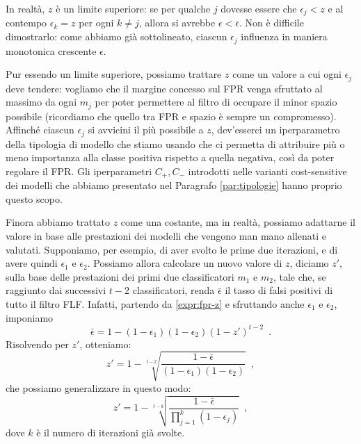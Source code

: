 In realtà, $z$ è un limite superiore: se per qualche $j$ dovesse essere che $\epsilon_j < z$ e al contempo $\epsilon_k=z$ per ogni $k\neq j$, allora si avrebbe $\epsilon < \bar \epsilon$. Non è difficile dimostrarlo: come abbiamo già sottolineato, ciascun $\epsilon_j$ influenza in maniera monotonica crescente $\epsilon$.

Pur essendo un limite superiore, possiamo trattare $z$ come un valore a cui ogni $\epsilon_j$ deve tendere: vogliamo che il margine concesso sul FPR venga sfruttato al massimo da ogni $m_j$ per poter permettere al filtro di occupare il minor spazio possibile (ricordiamo che quello tra FPR e spazio è sempre un compromesso). Affinché ciascun $\epsilon_j$ si avvicini il più possibile a $z$, dev'esserci un iperparametro della tipologia di modello che stiamo usando che ci permetta di attribuire più o meno importanza alla classe positiva rispetto a quella negativa, così da poter regolare il FPR. Gli iperparametri $C_+, C_-$ introdotti nelle varianti cost-sensitive dei modelli che abbiamo presentato nel Paragrafo \ref{par:tipologie} hanno proprio questo scopo.

Finora abbiamo trattato $z$ come una costante, ma in realtà, possiamo adattarne il valore in base alle prestazioni dei modelli che vengono man mano allenati e valutati. 
Supponiamo, per esempio, di aver svolto le prime due iterazioni, e di avere quindi $\epsilon_1$ e $\epsilon_2$. 
Possiamo allora calcolare un nuovo valore di $z$, diciamo $z'$, sulla base delle prestazioni dei primi due classificatori $m_1$ e $m_2$, tale che, se raggiunto dai successivi $t-2$ classificatori, renda $\bar\epsilon$ il tasso di falsi positivi di tutto il filtro FLF. Infatti, partendo da \eqref{expr:fpr-z} e sfruttando anche $\epsilon_1$ e $\epsilon_2$, imponiamo
\begin{equation}
    \bar \epsilon = 1- (1-\epsilon_1)(1-\epsilon_2)(1-z')^{t-2} \enspace.
\end{equation}
Risolvendo per $z'$, otteniamo:
\begin{equation}
    z' = 1-\sqrt[t-2]{\frac{1-\bar{\epsilon}}{\left(1-\epsilon_{1}\right)\left(1-\epsilon_{2}\right)}} \enspace,
\end{equation}
che possiamo generalizzare in questo modo:
\begin{equation}
    z' = 1-\sqrt[t-k]{\frac{1-\bar{\epsilon}}{\prod_{j=1}^k (1-\epsilon_j)}} \enspace,
    \label{expr:adattamento-z}
\end{equation}
dove $k$ è il numero di iterazioni già svolte.

